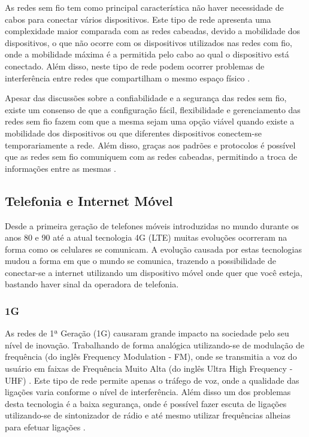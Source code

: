 As redes sem fio tem como principal característica não haver necessidade de cabos para conectar vários dispositivos. Este tipo de rede apresenta uma complexidade maior comparada com as redes cabeadas, devido a mobilidade dos dispositivos, o que não ocorre com os dispositivos utilizados nas redes com fio, onde a mobilidade máxima é a permitida pelo cabo ao qual o dispositivo está conectado. Além disso, neste tipo de rede podem ocorrer problemas de interferência entre redes que compartilham o mesmo espaço físico \cite{IEEE80211}.

Apesar das discussões sobre a confiabilidade e a segurança das redes sem fio, existe um consenso de que a configuração fácil, flexibilidade e gerenciamento das redes sem fio fazem com que a mesma sejam uma opção viável quando existe a mobilidade dos dispositivos ou que diferentes dispositivos conectem-se temporariamente a rede. Além disso, graças aos padrões e protocolos é possível que as redes sem fio comuniquem com as redes cabeadas, permitindo a troca de informações entre as mesmas \cite{RedesSemFioUFLA}.

\subsection{Telefonia e Internet Móvel}
Desde a primeira geração de telefones móveis introduzidas no mundo durante os anos 80 e 90  até a atual tecnologia 4G (LTE) muitas evoluções ocorreram na forma como os celulares se comunicam. A evolução causada por estas tecnologias mudou a forma em que o mundo se comunica, trazendo a possibilidade de conectar-se a internet utilizando um dispositivo móvel onde quer que você esteja, bastando haver sinal da operadora de telefonia.

\subsubsection{1G}
As redes de 1ª Geração (1G) causaram grande impacto na sociedade pelo seu nível de inovação. Trabalhando de forma analógica utilizando-se de modulação de frequência (do inglês Frequency Modulation - FM), onde se transmitia a voz do usuário em faixas de Frequência Muito Alta (do inglês Ultra High Frequency - UHF) \cite{AEvolucaoTelefoniaCelular}. Este tipo de rede permite apenas o tráfego de voz, onde a qualidade das ligações varia conforme o nível de interferência. Além disso um dos problemas desta tecnologia é a baixa segurança, onde é possível fazer escuta de ligações utilizando-se de sintonizador de rádio e até mesmo utilizar frequências alheias para efetuar ligações  \cite{GeracoesTelefoniaMovel}.

